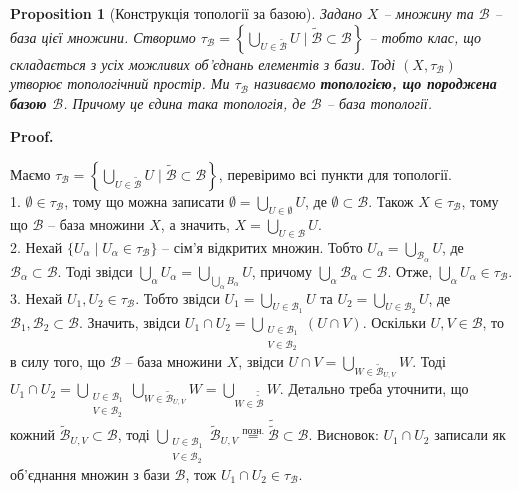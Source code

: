 \documentclass[a4paper, 10pt]{article}
\makeatletter
\theoremstyle{theoremdd}
\newtheorem{proposition}[theorem]{Proposition}
\renewenvironment{proof}[1][Proof.\\]{\par
\pushQED{\hfill \qed}%
\normalfont \topsep6\p@\@plus6\p@\relax
\trivlist
\item\relax
{\bfseries
#1\@addpunct{.}}\hspace\labelsep\ignorespaces
}{%
\popQED\endtrivlist\@endpefalse
}
\makeatother
\begin{document}
\begin{proposition}[Конструкція топології за базою]
Задано $X$ -- множину та $\mathcal{B}$ -- база цієї множини. Створимо $\tau_{\mathcal{B}} = \left\{ \displaystyle\bigcup_{U \in \mathcal{\mathcal{\tilde{B}}}} U \mid \mathcal{\tilde{B}} \subset \mathcal{B} \right\}$ -- тобто клас, що складається з усіх можливих об'єднань елементів з бази. Тоді $(X,\tau_{\mathcal{B}})$ утворює топологічний простір. Ми $\tau_{\mathcal{B}}$ називаємо \textbf{топологією, що породжена базою $\mathcal{B}$}. Причому це єдина така топологія, де $\mathcal{B}$ -- база топології.
\end{proposition}

\begin{proof}
Маємо $\tau_{\mathcal{B}} = \left\{ \displaystyle\bigcup_{U \in \mathcal{\mathcal{\tilde{B}}}} U \mid \mathcal{\tilde{B}} \subset \mathcal{B} \right\}$, перевіримо всі пункти для топології.\\
1. $\emptyset \in \tau_{\mathcal{B}}$, тому що можна записати $\emptyset = \displaystyle\bigcup_{U \in \emptyset} U$, де $\emptyset \subset \mathcal{B}$. Також $X \in \tau_{\mathcal{B}}$, тому що $\mathcal{B}$ -- база множини $X$, а значить, $X = \displaystyle\bigcup_{U \in \mathcal{B}} U$.\\
2. Нехай $\{U_\alpha \mid U_\alpha \in \tau_{\mathcal{B}}\}$ -- сім'я відкритих множин. Тобто $U_\alpha = \displaystyle\bigcup_{\mathcal{B}_\alpha} U$, де $\mathcal{B}_\alpha \subset \mathcal{B}$. Тоді звідси $\displaystyle\bigcup_\alpha U_\alpha = \bigcup_{\bigcup_\alpha B_\alpha} U$, причому $\displaystyle\bigcup_\alpha \mathcal{B}_\alpha \subset \mathcal{B}$. Отже, $\displaystyle\bigcup_\alpha U_\alpha \in \tau_\mathcal{B}$.\\
3. Нехай $U_1,U_2 \in \tau_\mathcal{B}$. Тобто звідси $U_1 = \displaystyle\bigcup_{U \in \mathcal{B}_1} U$ та $U_2 = \displaystyle\bigcup_{U \in \mathcal{B}_2} U$, де $\mathcal{B}_1,\mathcal{B}_2 \subset \mathcal{B}$. Значить, звідси $U_1 \cap U_2 = \displaystyle\bigcup_{\substack{U \in \mathcal{B}_1 \\ V \in \mathcal{B}_2}} (U \cap V)$. Оскільки $U,V \in \mathcal{B}$, то в силу того, що $\mathcal{B}$ -- база множини $X$, звідси $U \cap V = \displaystyle\bigcup_{W \in \mathcal{\tilde{B}}_{U,V}} W$. Тоді $U_1 \cap U_2 = \displaystyle\bigcup_{\substack{U \in \mathcal{B}_1 \\ V \in \mathcal{B}_2}} \bigcup_{W \in \mathcal{\tilde{B}}_{U,V}} W = \displaystyle\bigcup_{W \in \mathcal{\tilde{\tilde{B}}}} W$. Детально треба уточнити, що кожний $\mathcal{\tilde{B}}_{U,V} \subset \mathcal{B}$, тоді $\displaystyle\bigcup_{\substack{U \in \mathcal{B}_1 \\ V \in \mathcal{B}_2}} \mathcal{\tilde{B}}_{U,V} \overset{\text{позн.}}{=} \mathcal{\tilde{\tilde{B}}} \subset \mathcal{B}$. Висновок: $U_1 \cap U_2$ записали як об'єднання множин з бази $\mathcal{B}$, тож $U_1 \cap U_2 \in \tau_{\mathcal{B}}$.\\

\end{proof}
\end{document}
